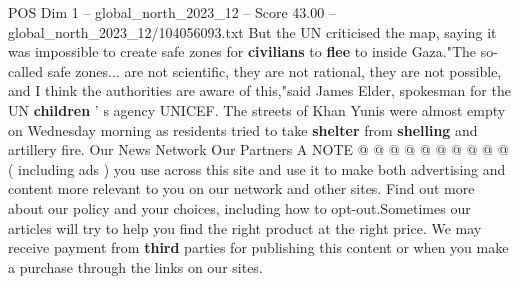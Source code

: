 \begin{textsample}{POS Dim 1 – global\_north\_2023\_12 – Score 43.00 – global\_north\_2023\_12/104056093.txt}
But the UN criticised the map, saying it was impossible to create safe zones for \textbf{civilians} to \textbf{flee} to inside Gaza."The so-called safe zones... are not scientific, they are not rational, they are not possible, and I think the authorities are aware of this,"said James Elder, spokesman for the UN \textbf{children} ' s agency UNICEF.
The streets of Khan Yunis were almost empty on Wednesday morning as residents tried to take \textbf{shelter} from \textbf{shelling} and artillery fire.
Our News Network Our Partners A NOTE @ @ @ @ @ @ @ @ @ @ ( including ads ) you use across this site and use it to make both advertising and content more relevant to you on our network and other sites.
Find out more about our policy and your choices, including how to opt-out.Sometimes our articles will try to help you find the right product at the right price.
We may receive payment from \textbf{third} parties for publishing this content or when you make a purchase through the links on our sites.

\end{textsample}
